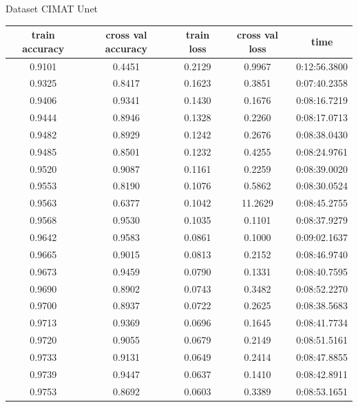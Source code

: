 \begin{frame}{Dataset CIMAT}
    \tiny
    Unet
    \centering
    \begin{tabular}{c|c|c|c|c}
         \hline        train accuracy&cross val accuracy&train loss&cross val loss&time\\
         \hline
0.9101&0.4451&0.2129&0.9967&0:12:56.3800\\
0.9325&0.8417&0.1623&0.3851&0:07:40.2358\\
0.9406&0.9341&0.1430&0.1676&0:08:16.7219\\
0.9444&0.8946&0.1328&0.2260&0:08:17.0713\\
0.9482&0.8929&0.1242&0.2676&0:08:38.0430\\
0.9485&0.8501&0.1232&0.4255&0:08:24.9761\\
0.9520&0.9087&0.1161&0.2259&0:08:39.0020\\
0.9553&0.8190&0.1076&0.5862&0:08:30.0524\\
0.9563&0.6377&0.1042&11.2629&0:08:45.2755\\
0.9568&0.9530&0.1035&0.1101&0:08:37.9279\\
0.9642&0.9583&0.0861&0.1000&0:09:02.1637\\
0.9665&0.9015&0.0813&0.2152&0:08:46.9740\\
0.9673&0.9459&0.0790&0.1331&0:08:40.7595\\
0.9690&0.8902&0.0743&0.3482&0:08:52.2270\\
0.9700&0.8937&0.0722&0.2625&0:08:38.5683\\
0.9713&0.9369&0.0696&0.1645&0:08:41.7734\\
0.9720&0.9055&0.0679&0.2149&0:08:51.5161\\
0.9733&0.9131&0.0649&0.2414&0:08:47.8855\\
0.9739&0.9447&0.0637&0.1410&0:08:42.8911\\
0.9753&0.8692&0.0603&0.3389&0:08:53.1651\\
\hline
    \end{tabular}
\end{frame}
